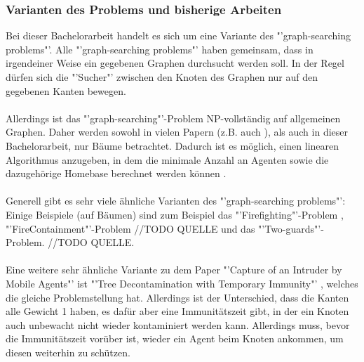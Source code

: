 \subsubsection*{Varianten des Problems und bisherige Arbeiten}

Bei dieser Bachelorarbeit handelt es sich um eine Variante des "'graph-searching problems"'. Alle "'graph-searching problems"' haben gemeinsam, dass in irgendeiner Weise ein gegebenen Graphen durchsucht werden soll. In der Regel dürfen sich die "'Sucher"' zwischen den Knoten des Graphen nur auf den gegebenen Kanten bewegen.
\\
\\
Allerdings ist das "'graph-searching"'-Problem NP-vollständig \cite{complexity_paper} auf allgemeinen Graphen. Daher werden sowohl in vielen Papern (z.B. auch \cite{cima_paper}), als auch in dieser Bachelorarbeit, nur Bäume betrachtet. Dadurch ist es möglich, einen linearen Algorithmus anzugeben, in dem die minimale Anzahl an Agenten sowie die dazugehörige Homebase berechnet werden können \cite{cima_paper}.
\\
\\
Generell gibt es sehr viele ähnliche Varianten des "'graph-searching problems"':\\
Einige Beispiele (auf Bäumen) sind zum Beispiel das "'Firefighting"'-Problem \cite{firefighterproblem_paper}, "'FireContainment"'-Problem //TODO QUELLE und das "'Two-guards"'-Problem. //TODO QUELLE.
\\
\\
Eine weitere sehr ähnliche Variante zu dem Paper "'Capture of an Intruder by Mobile Agents"' \cite{cima_paper} ist "'Tree Decontamination with Temporary Immunity"' \cite{tdti_paper}, welches die gleiche Problemstellung hat. Allerdings ist der Unterschied, dass die Kanten alle Gewicht 1 haben, es dafür aber eine Immunitätszeit gibt, in der ein Knoten auch unbewacht nicht wieder kontaminiert werden kann. Allerdings muss, bevor die Immunitätszeit vorüber ist, wieder ein Agent beim Knoten ankommen, um diesen  weiterhin zu schützen.

